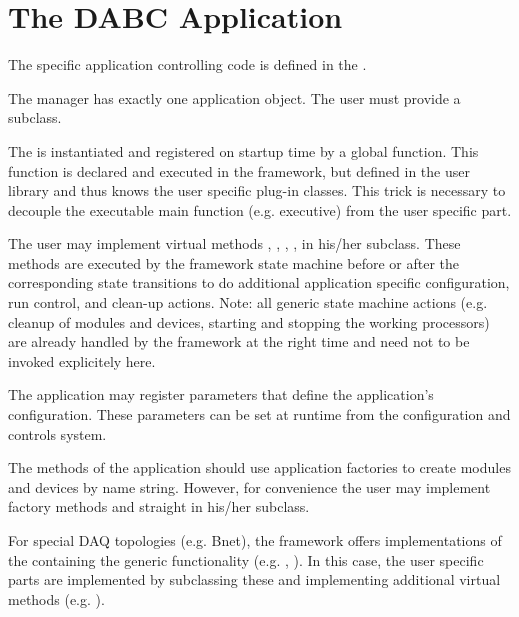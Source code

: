 \section{The DABC Application}
The specific application controlling code is defined in 
   the .   
\begin{compactitem}[$\circ$]
\item  The manager has exactly one application object. 
      The user must provide a  subclass.
\item  The  is instantiated and registered on 
      startup time by a global  function. This function 
      is declared and executed in the framework, but defined in the user 
      library and thus knows the user specific plug-in classes. 
      This trick is necessary to decouple the executable main function 
      (e.g. \xdaq executive) from the user specific part.  
\item  The user may implement virtual methods  ,  
      , , 
      ,  in his/her 
       subclass. These methods are executed by the 
      framework state machine before or after the corresponding state 
      transitions to do additional application specific configuration, 
      run control, and clean-up actions. Note: all generic state machine 
      actions (e.g. cleanup of modules and devices, starting 
      and stopping the working processors) are already handled by 
      the framework at the right time and need not to be invoked explicitely here.
\item  The application  may register parameters that 
      define the application's configuration. These parameters can be set at 
      runtime from the configuration and controls system.
\item  The methods of the application  should use 
      application factories to create modules and 
      devices by name string. However, for convenience the user may 
      implement factory methods  and  straight 
      in his/her  subclass.
\item   For special DAQ topologies (e.g. Bnet), the framework offers 
      implementations of the  containing the 
      generic functionality (e.g. , ). 
      In this case, the user specific parts are implemented by subclassing 
      these and implementing additional virtual methods (e.g. ).    
\end{compactitem}






